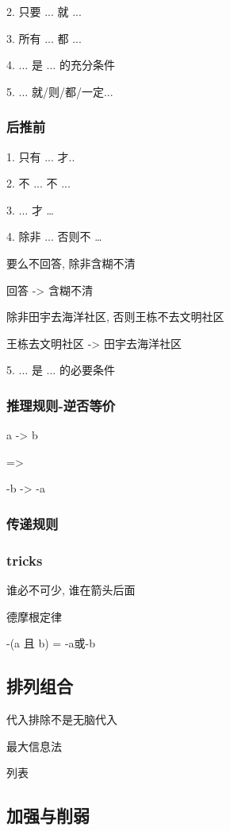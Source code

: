 2. 只要 ... 就 ...

3. 所有 ... 都 ...

4. ... 是 ... 的充分条件

5. ... 就/则/都/一定...

\subsubsection{后推前}

1. 只有 ... 才..

2. 不 ... 不 ...

3. ... 才 \dots

4. 除非 ... 否则不 \dots

要么不回答, 除非含糊不清

回答 -> 含糊不清

除非田宇去海洋社区, 否则王栋不去文明社区

王栋去文明社区 -> 田宇去海洋社区

5. ... 是 ... 的必要条件

\subsubsection{推理规则-逆否等价}

a -> b

=>

-b -> -a

\subsubsection{传递规则}

\subsubsection{tricks}

谁必不可少, 谁在箭头后面

德摩根定律

-(a 且 b) = -a或-b

\subsection{排列组合}

代入排除不是无脑代入


最大信息法

列表

\subsection{加强与削弱}

